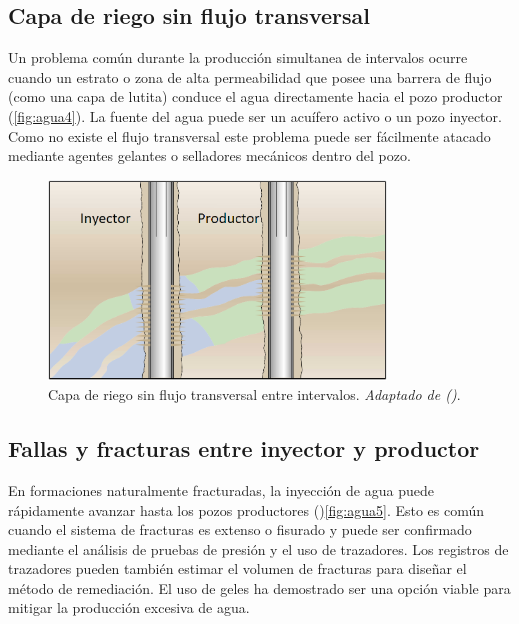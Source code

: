 \subsection{Capa de riego sin flujo transversal}
Un problema común durante la producción simultanea de intervalos ocurre cuando un estrato o zona de alta permeabilidad que posee una barrera de flujo (como una capa de lutita) conduce el agua directamente hacia el pozo productor (\autoref{fig:agua4}). La fuente del agua puede ser un acuífero activo o un pozo inyector. Como no existe el flujo transversal este problema puede ser fácilmente atacado mediante agentes gelantes o selladores mecánicos dentro del pozo.

\begin{figure}\centering
    \includegraphics[width=0.8\textwidth]{Graphics/agua4.png}
    \caption[Capa de riego sin flujo transversal]{Capa de riego sin flujo transversal entre intervalos. \emph{Adaptado de (\cite{Bailey2000})}.}
    \label{fig:agua4}
\end{figure}


\subsection{Fallas y fracturas entre inyector y productor}
En formaciones naturalmente fracturadas, la inyección de agua puede rápidamente avanzar hasta los pozos productores ()\autoref{fig:agua5}. Esto es común cuando el sistema de fracturas es extenso o fisurado y puede ser confirmado mediante el análisis de pruebas de presión y el uso de trazadores. Los registros de trazadores pueden también estimar el volumen de fracturas para diseñar el método de remediación. El uso de geles ha demostrado ser una opción viable para mitigar la producción excesiva de agua.

